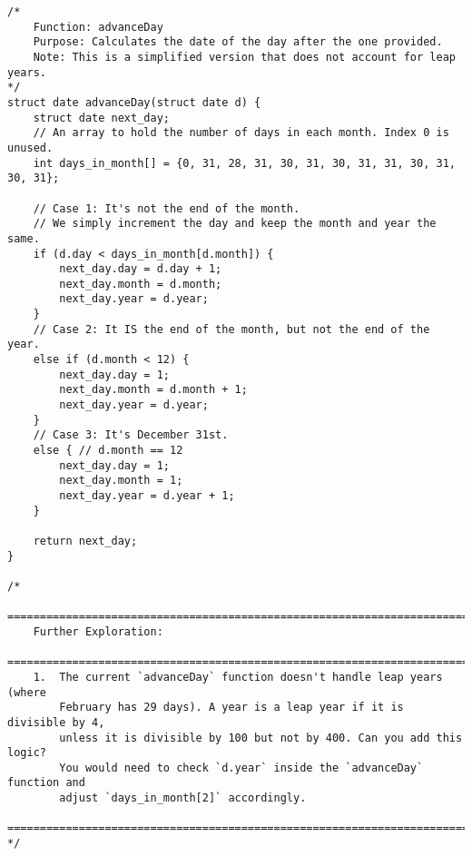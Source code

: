 \documentclass[11pt]{book}
\begin{document}
\begin{verbatim}
/*
    Function: advanceDay
    Purpose: Calculates the date of the day after the one provided.
    Note: This is a simplified version that does not account for leap years.
*/
struct date advanceDay(struct date d) {
    struct date next_day;
    // An array to hold the number of days in each month. Index 0 is unused.
    int days_in_month[] = {0, 31, 28, 31, 30, 31, 30, 31, 31, 30, 31, 30, 31};

    // Case 1: It's not the end of the month.
    // We simply increment the day and keep the month and year the same.
    if (d.day < days_in_month[d.month]) {
        next_day.day = d.day + 1;
        next_day.month = d.month;
        next_day.year = d.year;
    }
    // Case 2: It IS the end of the month, but not the end of the year.
    else if (d.month < 12) {
        next_day.day = 1;
        next_day.month = d.month + 1;
        next_day.year = d.year;
    }
    // Case 3: It's December 31st.
    else { // d.month == 12
        next_day.day = 1;
        next_day.month = 1;
        next_day.year = d.year + 1;
    }

    return next_day;
}

/*
    ================================================================================
    Further Exploration:
    ================================================================================
    1.  The current `advanceDay` function doesn't handle leap years (where
        February has 29 days). A year is a leap year if it is divisible by 4,
        unless it is divisible by 100 but not by 400. Can you add this logic?
        You would need to check `d.year` inside the `advanceDay` function and
        adjust `days_in_month[2]` accordingly.
    ================================================================================
*/

\end{verbatim}
\clearpage
\end{document}
